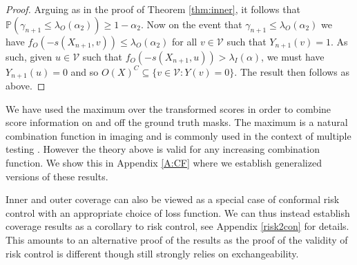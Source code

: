 \begin{proof}
	Arguing as in the proof of Theorem \ref{thm:inner}, it follows that $\mathbb{P}\left(\gamma_{n+1} \leq \lambda_O(\alpha_2) \right) \geq 1 - \alpha_2.$
	Now on the event that $\gamma_{n+1}\leq \lambda_O(\alpha_2)$ we have $ f_O(-s(X_{n+1},v)) \leq \lambda_O(\alpha_2) $ for all $v \in \mathcal{V}$ such that $Y_{n+1}(v) = 1$. As such, given $u \in \mathcal{V}$ such that $ f_O(-s(X_{n+1},u)) > \lambda_I(\alpha) $, we must have $Y_{n+1}(u) = 0$ and so $	O(X)^C  \subseteq \lbrace v\in \mathcal{V}: Y(v) = 0 \rbrace  $. The result then follows as above.
\end{proof}
\begin{remark}\label{rmk:max}
	We have used the maximum over the transformed scores in order to combine score information on and off the ground truth masks. The maximum is a natural combination function in imaging and is commonly used in the context of multiple testing \citep{Worsley1992, Bowring2019}. However the theory above is valid for any increasing combination function. We show this in Appendix \ref{A:CF} where we establish generalized versions of these results.
\end{remark}
\begin{remark}
	Inner and outer coverage can also be viewed as a special case of conformal risk control with an appropriate choice of loss function. We can thus instead establish coverage results as a corollary to risk control, see Appendix \ref{risk2con} for details. This amounts to an alternative proof of the results as the proof of the validity of risk control is different though still strongly relies on exchangeability.
\end{remark}


